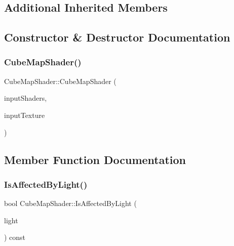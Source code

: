 \subsection*{Additional Inherited Members}


\subsection{Constructor \& Destructor Documentation}
\hypertarget{class_cube_map_shader_abfd5fb870087965ef8d37323f7f9ed3a}{}\label{class_cube_map_shader_abfd5fb870087965ef8d37323f7f9ed3a} 
\subsubsection{\texorpdfstring{Cube\+Map\+Shader()}{CubeMapShader()}}
{\footnotesize\ttfamily Cube\+Map\+Shader\+::\+Cube\+Map\+Shader (\begin{DoxyParamCaption}\item[{const std\+::unordered\+\_\+map$<$ G\+Lenum, std\+::string $>$ \&}]{input\+Shaders,  }\item[{std\+::shared\+\_\+ptr$<$ class \hyperlink{class_cube_map_texture}{Cube\+Map\+Texture} $>$}]{input\+Texture }\end{DoxyParamCaption})}



\subsection{Member Function Documentation}
\hypertarget{class_cube_map_shader_aa0c9e535cb18663acd9857165abc788f}{}\label{class_cube_map_shader_aa0c9e535cb18663acd9857165abc788f} 
\subsubsection{\texorpdfstring{Is\+Affected\+By\+Light()}{IsAffectedByLight()}}
{\footnotesize\ttfamily bool Cube\+Map\+Shader\+::\+Is\+Affected\+By\+Light (\begin{DoxyParamCaption}\item[{const class \hyperlink{class_light}{Light} $\ast$}]{light }\end{DoxyParamCaption}) const\hspace{0.3cm}{\ttfamily [virtual]}}



